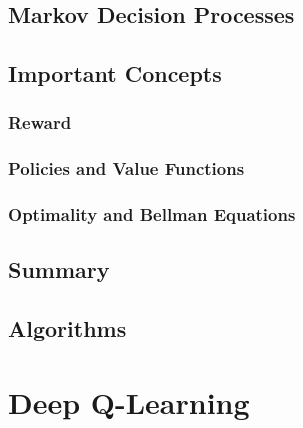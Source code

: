 \subsection{Markov Decision Processes}

\subsection{Important Concepts}

\subsubsection{Reward}

\subsubsection{Policies and Value Functions}

\subsubsection{Optimality and Bellman Equations}

\subsection{Summary}

\subsection{Algorithms}



\section{Deep Q-Learning}